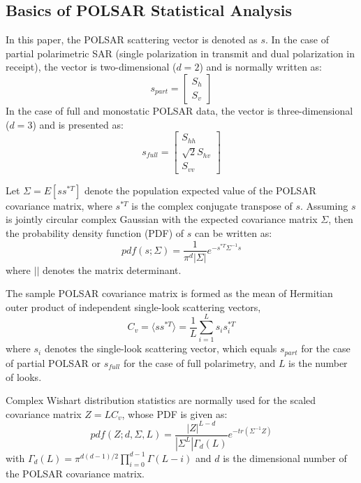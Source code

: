 \documentclass[journal,12pt,draftcls,onecolumn]{IEEEtran}
\begin{document}
\subsection{Basics of POLSAR Statistical Analysis}
\label{sec:model_basic}

In this paper, the POLSAR scattering vector is denoted as $s$.
In the case of partial polarimetric SAR (single polarization in transmit and dual polarization in receipt),
  the vector is two-dimensional ($d=2$) and is normally written as: 
\begin{equation}
s_{part}=\begin{bmatrix}
S_h\\ 
S_v
\end{bmatrix}
\end{equation}
In the case of full and monostatic POLSAR data,
  the vector is three-dimensional ($d=3$) and is presented as:
\begin{equation}
s_{full}=\begin{bmatrix}
S_{hh}\\
\sqrt{2}S_{hv}\\
S_{vv}
\end{bmatrix}
\end{equation}

Let $\Sigma=E [ss^{*T}]$ denote the population expected value of the POLSAR covariance matrix,
  where $s^{*T}$ is the complex conjugate transpose of $s$. 
Assuming %
  $s$ is jointly circular complex Gaussian with the expected covariance matrix $\Sigma$,
  then the probability density function (PDF) of $s$ can be written as:
\begin{equation}
  pdf(s;\Sigma)=\frac{1}{\pi^d|\Sigma|} e^{-s^{*T}\Sigma^{-1}s}
\end{equation}
where $||$ denotes the matrix determinant.

The sample POLSAR covariance matrix is formed as the mean of Hermitian outer product of independent single-look scattering vectors,
\begin{equation}
  C_v = \langle ss^{*T} \rangle = \frac{1}{L} \sum^L_{i=1}s_is_i^{*T}
\end{equation}
where $s_i$ denotes the single-look scattering vector,
  which equals $s_{part}$ for the case of partial POLSAR or
  $s_{full}$ for the case of full polarimetry,
and $L$ is the number of looks.

Complex Wishart distribution statistics are normally used for the scaled covariance matrix
$Z=LC_v$, whose PDF is given as:
\begin{equation}
  pdf(Z;d,\Sigma,L)=\frac{|Z|^{L-d}}{|\Sigma^L|\Gamma_d(L)}e^{-tr(\Sigma^{-1}Z)}
\end{equation}
with $\Gamma_d(L) = \pi^{d(d-1)/2} \prod^{d-1}_{i=0}\Gamma(L-i)$
and $d$ is the dimensional number of the POLSAR covariance matrix.
\end{document}
